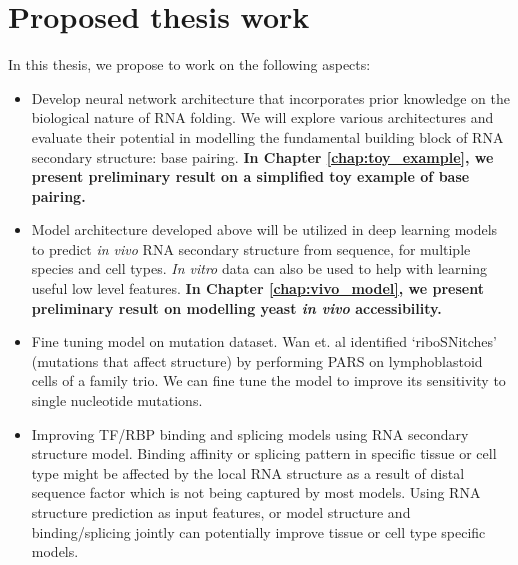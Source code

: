 \documentclass{proposal}
\begin{document}
\section{Proposed thesis work}

In this thesis, we propose to work on the following aspects:

\begin{itemize}
    \item Develop neural network architecture that incorporates prior knowledge on the biological nature of RNA folding.
    We will explore various architectures and evaluate their potential in modelling the
    fundamental building block of RNA secondary structure: base pairing.
    \textbf{In Chapter \ref{chap:toy_example}, we present preliminary result on a simplified toy example of base pairing.}

    \item Model architecture developed above will be utilized in deep learning models to predict
    \textit{in vivo} RNA secondary structure from sequence, for multiple species and cell types.
        \textit{In vitro} data can also be used to help with learning useful low level features.
    \textbf{In Chapter \ref{chap:vivo_model}, we present preliminary result on modelling yeast \textit{in vivo} accessibility.}


    \item Fine tuning model on mutation dataset.
        Wan et. al\cite{wan2014landscape} identified `﻿riboSNitches' (mutations that affect structure)
        by performing PARS on ﻿lymphoblastoid cells of a family trio.
        We can fine tune the model to improve its sensitivity to single nucleotide mutations.


%

    \item Improving TF/RBP binding and splicing models using RNA secondary structure model.
        Binding affinity or splicing pattern in specific tissue or cell type might be affected
        by the local RNA structure as a result of distal sequence factor which is not being captured by most models.
        Using RNA structure prediction as input features, or model structure and binding/splicing jointly can potentially improve tissue or cell type specific models.
\end{itemize}
\end{document}
